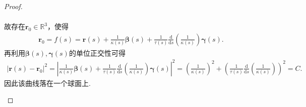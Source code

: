 \documentclass[../../main.tex]{subfiles}%
\begin{document}
\begin{proof}
\begin{enumerate}[(1)]
\begin{align*}
\end{align*}
故存在$\bm{r}_0\in\mathbb{R}^3$，使得
\begin{align*}
\bm{r}_0=f(s)=\bm{r}(s)+\frac{1}{\kappa(s)}\bm{\beta}(s)+\frac{1}{\tau(s)}\frac{\mathrm{d}}{\mathrm{d}s}\left( \frac{1}{\kappa(s)} \right)\bm{\gamma}(s).
\end{align*}
再利用$\bm{\beta}(s),\bm{\gamma}(s)$的单位正交性可得
\begin{align*}
|\bm{r}(s)-\bm{r}_0|^2=\left| \frac{1}{\kappa(s)}\bm{\beta}(s)+\frac{1}{\tau(s)}\frac{\mathrm{d}}{\mathrm{d}s}\left( \frac{1}{\kappa(s)} \right)\bm{\gamma}(s) \right|^2=\left( \frac{1}{\kappa(s)} \right)^2+\left( \frac{1}{\tau(s)}\frac{\mathrm{d}}{\mathrm{d}s}\left( \frac{1}{\kappa(s)} \right) \right)^2=C.
\end{align*}
因此该曲线落在一个球面上.
\end{enumerate}

\end{proof}
\end{document}
